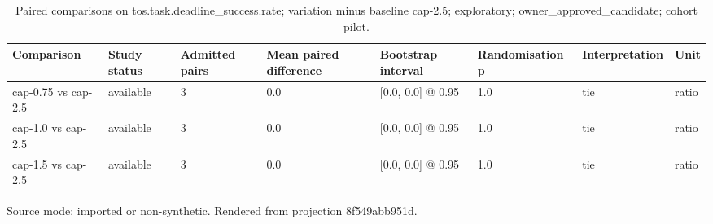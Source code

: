 {
\begin{table}[htbp]
\centering
\caption{Paired comparisons on tos.task.deadline\_success.rate; variation minus baseline cap-2.5; exploratory; owner\_approved\_candidate; cohort pilot.}
\label{tab:traffictwin-statistical-study-8f549abb951d}
\small
\renewcommand{\arraystretch}{1.15}
\begin{tabular}{llllllll}
\hline
Comparison & Study status & Admitted pairs & Mean paired difference & Bootstrap interval & Randomisation p & Interpretation & Unit \\
\hline
cap-0.75 vs cap-2.5 & available & 3 & 0.0 & [0.0, 0.0] @ 0.95 & 1.0 & tie & ratio \\
cap-1.0 vs cap-2.5 & available & 3 & 0.0 & [0.0, 0.0] @ 0.95 & 1.0 & tie & ratio \\
cap-1.5 vs cap-2.5 & available & 3 & 0.0 & [0.0, 0.0] @ 0.95 & 1.0 & tie & ratio \\
\hline
\end{tabular}
\par\footnotesize
Source mode: imported or non-synthetic.
Rendered from projection 8f549abb951d.
\end{table}
}

